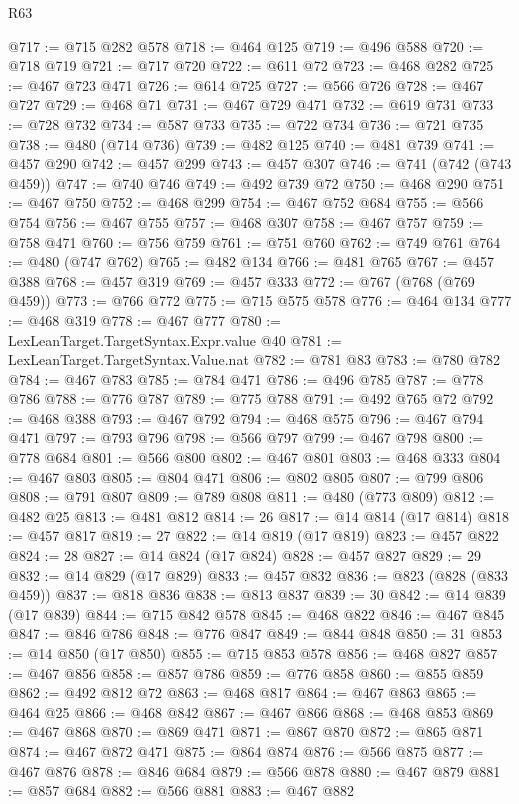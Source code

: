 \begin{lexlean}{R63}
\begin{coremodule}
@717 := @715 @282 @578
@718 := @464 @125
@719 := @496 @588
@720 := @718 @719
@721 := @717 @720
@722 := @611 @72
@723 := @468 @282
@725 := @467 @723 @471
@726 := @614 @725
@727 := @566 @726
@728 := @467 @727
@729 := @468 @71
@731 := @467 @729 @471
@732 := @619 @731
@733 := @728 @732
@734 := @587 @733
@735 := @722 @734
@736 := @721 @735
@738 := @480 (@714 @736)
@739 := @482 @125
@740 := @481 @739
@741 := @457 @290
@742 := @457 @299
@743 := @457 @307
@746 := @741 (@742 (@743 @459))
@747 := @740 @746
@749 := @492 @739 @72
@750 := @468 @290
@751 := @467 @750
@752 := @468 @299
@754 := @467 @752 @684
@755 := @566 @754
@756 := @467 @755
@757 := @468 @307
@758 := @467 @757
@759 := @758 @471
@760 := @756 @759
@761 := @751 @760
@762 := @749 @761
@764 := @480 (@747 @762)
@765 := @482 @134
@766 := @481 @765
@767 := @457 @388
@768 := @457 @319
@769 := @457 @333
@772 := @767 (@768 (@769 @459))
@773 := @766 @772
@775 := @715 @575 @578
@776 := @464 @134
@777 := @468 @319
@778 := @467 @777
@780 := LexLeanTarget.TargetSyntax.Expr.value @40
@781 := LexLeanTarget.TargetSyntax.Value.nat
@782 := @781 @83
@783 := @780 @782
@784 := @467 @783
@785 := @784 @471
@786 := @496 @785
@787 := @778 @786
@788 := @776 @787
@789 := @775 @788
@791 := @492 @765 @72
@792 := @468 @388
@793 := @467 @792
@794 := @468 @575
@796 := @467 @794 @471
@797 := @793 @796
@798 := @566 @797
@799 := @467 @798
@800 := @778 @684
@801 := @566 @800
@802 := @467 @801
@803 := @468 @333
@804 := @467 @803
@805 := @804 @471
@806 := @802 @805
@807 := @799 @806
@808 := @791 @807
@809 := @789 @808
@811 := @480 (@773 @809)
@812 := @482 @25
@813 := @481 @812
@814 := 26
@817 := @14 @814 (@17 @814)
@818 := @457 @817
@819 := 27
@822 := @14 @819 (@17 @819)
@823 := @457 @822
@824 := 28
@827 := @14 @824 (@17 @824)
@828 := @457 @827
@829 := 29
@832 := @14 @829 (@17 @829)
@833 := @457 @832
@836 := @823 (@828 (@833 @459))
@837 := @818 @836
@838 := @813 @837
@839 := 30
@842 := @14 @839 (@17 @839)
@844 := @715 @842 @578
@845 := @468 @822
@846 := @467 @845
@847 := @846 @786
@848 := @776 @847
@849 := @844 @848
@850 := 31
@853 := @14 @850 (@17 @850)
@855 := @715 @853 @578
@856 := @468 @827
@857 := @467 @856
@858 := @857 @786
@859 := @776 @858
@860 := @855 @859
@862 := @492 @812 @72
@863 := @468 @817
@864 := @467 @863
@865 := @464 @25
@866 := @468 @842
@867 := @467 @866
@868 := @468 @853
@869 := @467 @868
@870 := @869 @471
@871 := @867 @870
@872 := @865 @871
@874 := @467 @872 @471
@875 := @864 @874
@876 := @566 @875
@877 := @467 @876
@878 := @846 @684
@879 := @566 @878
@880 := @467 @879
@881 := @857 @684
@882 := @566 @881
@883 := @467 @882

\end{coremodule}
\end{lexlean}
